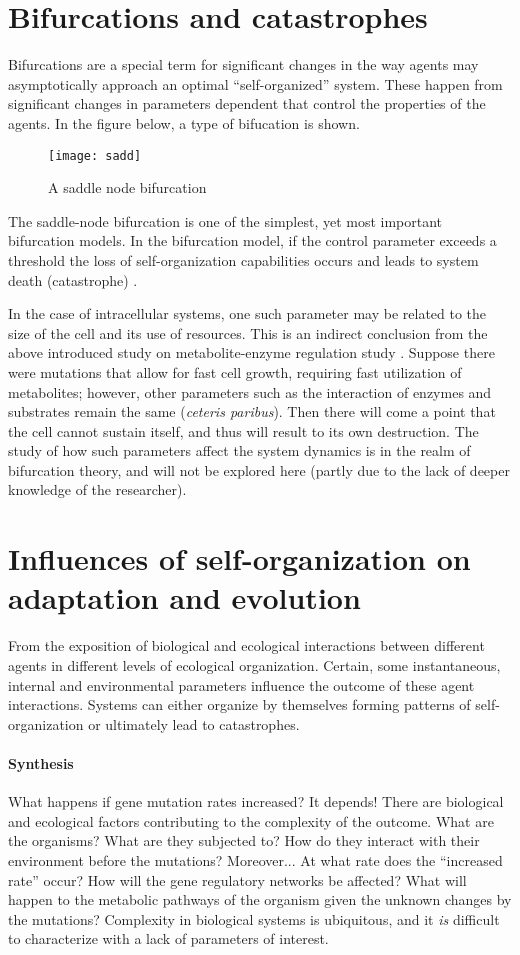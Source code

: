 \section{Bifurcations and catastrophes}

Bifurcations are a special term for significant changes in the way agents may asymptotically approach an optimal ``self-organized'' system.
These happen from significant changes in parameters dependent that control the properties of the agents.
In the figure below, a type of bifucation is shown.

\begin{figure}[h]
    \centering
    \texttt{[image: sadd]}
    \caption{A saddle node bifurcation}
    \label{fig:sadd}
\end{figure}

The saddle-node bifurcation is one of the simplest, yet most important bifurcation models.
In the bifurcation model, if the control parameter exceeds a threshold the loss of self-organization capabilities occurs and leads to system death (catastrophe) \cite{Devaney}.

In the case of intracellular systems, one such parameter may be related to the size of the cell and its use of resources.
This is an indirect conclusion from the above introduced study on metabolite-enzyme regulation study \cite{Chaves2019}.
Suppose there were mutations that allow for fast cell growth, requiring fast utilization of metabolites; however, other parameters such as the interaction of enzymes and substrates remain the same (\textit{ceteris paribus}).
Then there will come a point that the cell cannot sustain itself, and thus will result to its own destruction.
The study of how such parameters affect the system dynamics is in the realm of bifurcation theory, and will not be explored here (partly due to the lack of deeper knowledge of the researcher).

\section{Influences of self-organization on adaptation and evolution}
From the exposition of biological and ecological interactions between different agents in different levels of ecological organization.
Certain, some instantaneous, internal and environmental parameters influence the outcome of these agent interactions.
Systems can either organize by themselves forming patterns of self-organization or ultimately lead to catastrophes.

\paragraph{Synthesis}
What happens if gene mutation rates increased? It depends!
There are biological and ecological factors contributing to the complexity of the outcome.
What are the organisms? What are they subjected to?
How do they interact with their environment before the mutations?
Moreover... At what rate does the ``increased rate'' occur?
How will the gene regulatory networks be affected?
What will happen to the metabolic pathways of the organism given the unknown changes by the mutations?
Complexity in biological systems is ubiquitous, and it \emph{is} difficult to characterize with a lack of parameters of interest.
